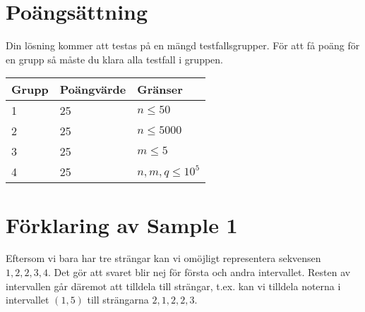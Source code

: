 \section*{Poängsättning}
Din lösning kommer att testas på en mängd testfallsgrupper. För att få poäng för en grupp så måste du klara alla testfall i gruppen.

\noindent
\begin{tabular}{| l | l | l |}
\hline
Grupp & Poängvärde & Gränser \\ \hline
1     & 25         & $n \le 50$ \\ \hline
2     & 25         & $n \le 5000$ \\ \hline
3     & 25         & $m \le 5$ \\ \hline
4     & 25         & $n, m, q \le 10^5$ \\ \hline
\end{tabular}

\section*{Förklaring av Sample 1}
Eftersom vi bara har tre strängar kan vi omöjligt representera sekvensen $1, 2, 2, 3, 4$.
Det gör att svaret blir nej för första och andra intervallet.
Resten av intervallen går däremot att tilldela till strängar, t.ex. kan vi tilldela noterna i intervallet $(1, 5)$ till strängarna $2, 1, 2, 2, 3$.
